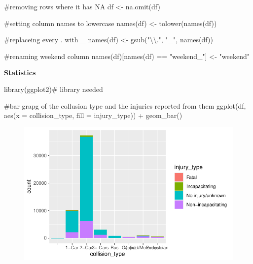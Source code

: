 \documentclass[
  letterpaper,
  DIV=11,
  numbers=noendperiod]{scrartcl}
\newenvironment{Shaded}{\begin{snugshade}}{\end{snugshade}}
\newcommand{\AttributeTok}[1]{\textcolor[rgb]{0.40,0.45,0.13}{#1}}
\newcommand{\CommentTok}[1]{\textcolor[rgb]{0.37,0.37,0.37}{#1}}
\newcommand{\FunctionTok}[1]{\textcolor[rgb]{0.28,0.35,0.67}{#1}}
\newcommand{\NormalTok}[1]{\textcolor[rgb]{0.00,0.23,0.31}{#1}}
\newcommand{\OtherTok}[1]{\textcolor[rgb]{0.00,0.23,0.31}{#1}}
\newcommand{\SpecialCharTok}[1]{\textcolor[rgb]{0.37,0.37,0.37}{#1}}
\newcommand{\StringTok}[1]{\textcolor[rgb]{0.13,0.47,0.30}{#1}}
\begin{document}
\begin{Shaded}
\begin{Highlighting}[]
\CommentTok{\#removing rows where it has NA}
\NormalTok{df }\OtherTok{\textless{}{-}} \FunctionTok{na.omit}\NormalTok{(df)}

\CommentTok{\#setting column names to lowercase}
\FunctionTok{names}\NormalTok{(df) }\OtherTok{\textless{}{-}} \FunctionTok{tolower}\NormalTok{(}\FunctionTok{names}\NormalTok{(df))}

\CommentTok{\#replaceing every . with \_}
\FunctionTok{names}\NormalTok{(df) }\OtherTok{\textless{}{-}} \FunctionTok{gsub}\NormalTok{(}\StringTok{"}\SpecialCharTok{\textbackslash{}\textbackslash{}}\StringTok{."}\NormalTok{, }\StringTok{"\_"}\NormalTok{, }\FunctionTok{names}\NormalTok{(df))}

\CommentTok{\#renaming weekend column}
\FunctionTok{names}\NormalTok{(df)[}\FunctionTok{names}\NormalTok{(df) }\SpecialCharTok{==} \StringTok{"weekend\_"}\NormalTok{] }\OtherTok{\textless{}{-}} \StringTok{"weekend"}
\end{Highlighting}
\end{Shaded}

\textbf{Statistics}

\begin{Shaded}
\begin{Highlighting}[]
\FunctionTok{library}\NormalTok{(ggplot2)}\CommentTok{\# library needed}

\CommentTok{\#bar grapg of the collusion type and the injuries reported from them}
\FunctionTok{ggplot}\NormalTok{(df, }\FunctionTok{aes}\NormalTok{(}\AttributeTok{x =}\NormalTok{ collision\_type, }\AttributeTok{fill =}\NormalTok{ injury\_type)) }\SpecialCharTok{+}
  \FunctionTok{geom\_bar}\NormalTok{()}
\end{Highlighting}
\end{Shaded}

\begin{figure}[H]

{\centering \includegraphics{380projectEDA_files/figure-pdf/unnamed-chunk-4-1.pdf}

}

\end{figure}
\end{document}
